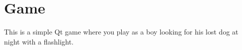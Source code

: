 \hypertarget{index_The}{}\section{Game}\label{index_The}
This is a simple Qt game where you play as a boy looking for his lost dog at night with a flashlight. 